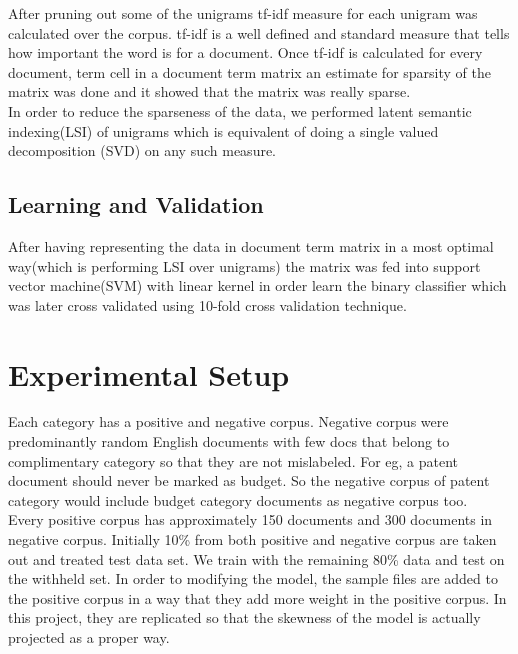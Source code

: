 \documentclass[11pt]{article}
\begin{document}
	After pruning out some of the unigrams tf-idf measure for each unigram was calculated over the corpus. tf-idf is a well defined and standard measure that tells how important the word is for a document. Once tf-idf is calculated for every document, term cell in a document term matrix an estimate for sparsity of the matrix was done and it showed that the matrix was really sparse. \\
	
	In order to reduce the sparseness of the data, we performed latent semantic indexing(LSI) of unigrams which is equivalent of doing a single valued decomposition (SVD) on any such measure.  \\
	
\subsection{Learning and Validation}
After having representing the data in document term matrix in a most optimal way(which is performing LSI over unigrams) the matrix was fed into support vector machine(SVM) with linear kernel in order learn the binary classifier which was later cross validated using 10-fold cross validation technique. \\

\section{Experimental Setup}
Each category has a positive and negative corpus. Negative corpus were predominantly random English documents with few docs that belong to complimentary category so that they are not mislabeled. For eg, a patent document should never be marked as budget. So the negative corpus of patent category would include budget category documents as negative corpus too. \\ 

Every positive corpus has approximately 150 documents and 300 documents in negative corpus. Initially 10\% from both positive and negative corpus are taken out and treated test data set. We train with the remaining 80\% data and test on the withheld set. In order to modifying the model, the sample files are added to the positive corpus in a way that they add more weight in the positive corpus. In this project, they are replicated so that the skewness of the model is actually projected as a proper way. \\








 
\end{document}
